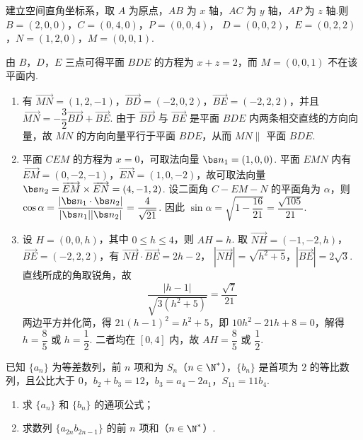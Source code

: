 \begin{solution}
建立空间直角坐标系，取 \(A\) 为原点，\(AB\) 为 \(x\) 轴，\(AC\) 为 \(y\) 轴，\(AP\) 为 \(z\) 轴.则
\(B=(2,0,0)\)，\(C=(0,4,0)\)，\(P=(0,0,4)\)，
\(D=(0,0,2)\)，\(E=(0,2,2)\)，\(N=(1,2,0)\)，\(M=(0,0,1)\).

由 \(B\)，\(D\)，\(E\) 三点可得平面 \(BDE\) 的方程为 \(x+z=2\)，而 \(M=(0,0,1)\) 不在该平面内.

\begin{enumerate}
\item 有 \(\overrightarrow{MN}=(1,2,-1)\)，\(\overrightarrow{BD}=(-2,0,2)\)，\(\overrightarrow{BE}=(-2,2,2)\)，并且
\(\overrightarrow{MN}=-\dfrac32\overrightarrow{BD}+\overrightarrow{BE}\). 由于 \(\overrightarrow{BD}\) 与 \(\overrightarrow{BE}\) 是平面 \(BDE\) 内两条相交直线的方向向量，故 \(MN\) 的方向向量平行于平面 \(BDE\)，从而 \(MN\parallel\) 平面 \(BDE\).

\item 平面 \(CEM\) 的方程为 \(x=0\)，可取法向量 \(\bs n_1=(1,0,0)\). 平面 \(EMN\) 内有
\(\overrightarrow{EM}=(0,-2,-1)\)，\(\overrightarrow{EN}=(1,0,-2)\)，故可取法向量
\(\bs n_2=\overrightarrow{EM}\times\overrightarrow{EN}=(4,-1,2)\). 设二面角 \(C-EM-N\) 的平面角为 \(\alpha\)，则
\(\cos\alpha=\dfrac{|\bs n_1\cdot\bs n_2|}{|\bs n_1||\bs n_2|}=\dfrac4{\sqrt{21}}\). 因此
\(\sin\alpha=\sqrt{1-\dfrac{16}{21}}=\dfrac{\sqrt{105}}{21}\).

\item 设 \(H=(0,0,h)\)，其中 \(0\leq h\leq4\)，则 \(AH=h\). 取
\(\overrightarrow{NH}=(-1,-2,h)\)，\(\overrightarrow{BE}=(-2,2,2)\)，有
\(\overrightarrow{NH}\cdot\overrightarrow{BE}=2h-2\)，
\(|\overrightarrow{NH}|=\sqrt{h^2+5}\)，\(|\overrightarrow{BE}|=2\sqrt3\). 直线所成的角取锐角，故
\[
\frac{|h-1|}{\sqrt{3(h^2+5)}}=\frac{\sqrt7}{21}
\]
两边平方并化简，得 \(21(h-1)^2=h^2+5\)，即
\(10h^2-21h+8=0\)，解得 \(h=\dfrac85\) 或 \(h=\dfrac12\). 二者均在 \([0,4]\) 内，故 \(AH=\dfrac85\) 或 \(\dfrac12\).
\end{enumerate}
\end{solution}

\begin{problem}
已知 \(\{a_n\}\) 为等差数列，前 \(n\) 项和为 \(S_n\)（\(n\in\N^*\)），\(\{b_n\}\) 是首项为 \(2\) 的等比数列，且公比大于 \(0\)，\(b_2+b_3=12\)，\(b_3=a_4-2a_1\)，\(S_{11}=11b_4\).

\begin{enumerate}
\item 求 \(\{a_n\}\) 和 \(\{b_n\}\) 的通项公式；
\item 求数列 \(\{a_{2n}b_{2n-1}\}\) 的前 \(n\) 项和（\(n\in\N^*\)）.
\end{enumerate}
\end{problem}

